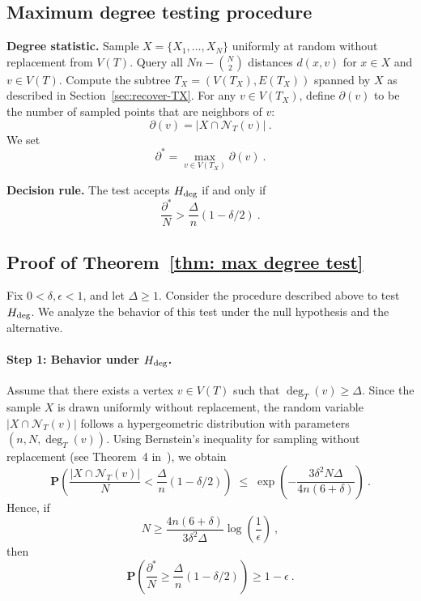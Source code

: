 \documentclass[12pt]{article}
\newcommand{\prob}[1]{\mathbf{P}\left( #1 \right)}
\newcommand{\degree}{\partial}
\begin{document}
\subsection{Maximum degree testing procedure}


\noindent\textbf{Degree statistic.} Sample $X=\{X_1,\dots,X_N\}$ uniformly at random without replacement from $V(T)$. Query all $Nn-{N \choose 2}$ distances $d(x,v)$ for $x\in X$ and $v\in V(T)$. Compute the subtree $T_{X}=(V(T_X),E(T_X))$ spanned by $X$ as described in Section~\ref{sec:recover-TX}. For any $v \in V(T_X)$, define $\degree(v)$ to be the number of sampled points that are neighbors of $v$:
\[
\degree(v)=|X\cap\mathcal{N}_T(v)|~.
\]
We set
\[
\degree^* = \max_{v\in V(T_X)} \degree(v)~.
\]

\noindent\textbf{Decision rule.}
The test accepts $H_{\rm deg}$ if and only if
\[
\frac{\degree^*}{N} > \frac{\Delta}{n}(1 - \delta/2)~.
\]


\subsection{Proof of Theorem~\ref{thm: max degree test}}

Fix $0 < \delta,\epsilon < 1$, and let $\Delta \ge 1$. Consider the procedure described above to test $H_{\rm deg}$. We analyze the behavior of this test under the null hypothesis and the alternative.

\paragraph{Step 1: Behavior under $H_{\rm deg}$.}
Assume that there exists a vertex $v\in V(T)$ such that $\deg_T(v)\ge \Delta$.
Since the sample $X$ is drawn uniformly without replacement, the random variable
$|X\cap\mathcal{N}_T(v)|$ follows a hypergeometric distribution with parameters
$(n,N,\deg_T(v))$.
Using Bernstein’s inequality for sampling without replacement (see Theorem~4 in~\cite{Ho63}),
we obtain
\[
\prob{
\frac{|X\cap\mathcal{N}_T(v)|}{N}
<
\frac{\Delta}{n}(1-\delta/2)
}
\;\le\;
\exp\!\left(
-\frac{3\delta^2N\Delta}{4n(6+\delta)}
\right)~.
\]
Hence, if
\[
N \ge
\frac{4n(6+\delta)}{3\delta^2\Delta}
\log\!\left(\frac{1}{\epsilon}\right)~,
\]
then
\[
\prob{
\frac{\degree^*}{N}
\ge
\frac{\Delta}{n}(1-\delta/2)
}
\ge
1-\epsilon~.
\]
\end{document}

